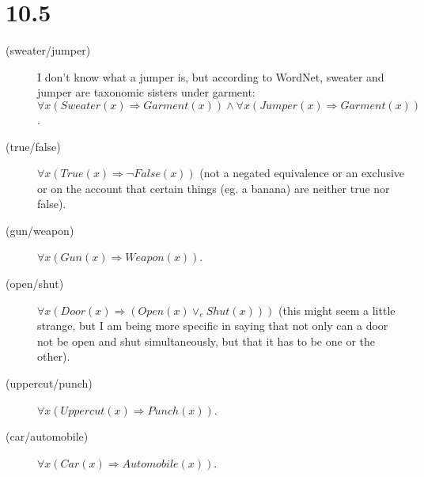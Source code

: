 \documentclass[12pt]{article}
\begin{document}
\section*{10.5}
\begin{description}
\item[(sweater/jumper)] I don't know what a jumper is, but according to WordNet,
sweater and jumper are taxonomic sisters under garment: $\forall x
(Sweater(x) \Rightarrow Garment(x)) \wedge \forall x (Jumper(x)
\Rightarrow Garment(x))$.
\item[(true/false)] $\forall x (True(x) \Rightarrow \neg False(x))$ (not
a negated equivalence or an exclusive or on the account that certain
things (eg. a banana) are neither true nor false).
\item[(gun/weapon)] $\forall x (Gun(x) \Rightarrow Weapon(x))$.
\item[(open/shut)] $\forall x (Door(x) \Rightarrow (Open(x) \vee_e
Shut(x)))$ (this might seem a little strange, but I am being more
specific in saying that not only can a door not be open and shut
simultaneously, but that it has to be one or the other).
\item[(uppercut/punch)] $\forall x (Uppercut(x) \Rightarrow Punch(x))$.
\item[(car/automobile)] $\forall x (Car(x) \Rightarrow Automobile(x))$.
\end{description}
\end{document}
